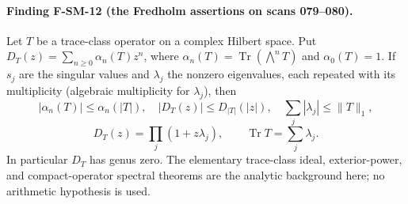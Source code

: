 \paragraph{Finding F-SM-12 (the Fredholm assertions on scans 079--080).}
Let $T$ be a trace-class operator on a complex Hilbert space.  Put
$D_T(z)=\sum_{n\geq0}\alpha_n(T)z^n$, where
$\alpha_n(T)=\operatorname{Tr}(\bigwedge^nT)$ and $\alpha_0(T)=1$.
If $s_j$ are the singular values and $\lambda_j$ the nonzero eigenvalues,
each repeated with its multiplicity (algebraic multiplicity for
$\lambda_j$), then
\[
 |\alpha_n(T)|\leq\alpha_n(|T|),\quad
 |D_T(z)|\leq D_{|T|}(|z|),\quad
 \sum_j|\lambda_j|\leq\|T\|_1,
\]
\[
 D_T(z)=\prod_j(1+z\lambda_j),\qquad
 \operatorname{Tr}T=\sum_j\lambda_j.
\]
In particular $D_T$ has genus zero.  The elementary trace-class ideal,
exterior-power, and compact-operator spectral theorems are the analytic
background here; no arithmetic hypothesis is used.

